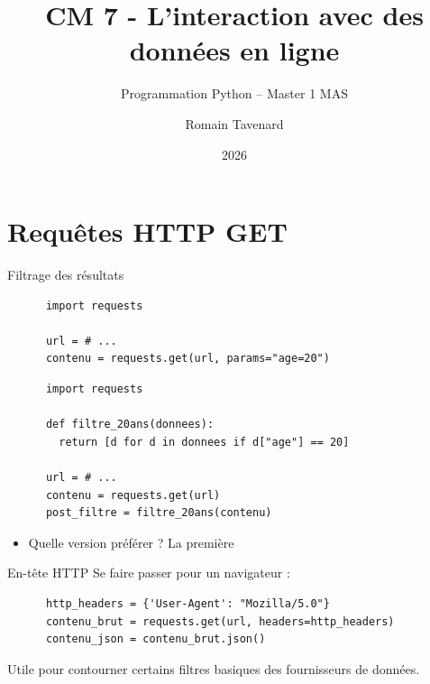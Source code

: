 \documentclass[10pt]{beamer}
\title[M1 MAS -- Python -- Fichiers]{CM 7 - L'interaction avec des données en ligne}
\subtitle{Programmation Python -- Master 1 MAS}
\author{Romain Tavenard}
\date{2026}
\institute{%
\hypersetup{urlcolor=.}
\makebox[2.2ex][c]{\faEnvelope}\enspace\href{mailto:romain.tavenard@univ-rennes2.fr}{\texttt{romain.tavenard@univ-rennes2.fr}}\\%
}
\begin{document}
\maketitle

\section{Requêtes HTTP GET}

\begin{frame}[fragile]{Filtrage des résultats}


  \begin{beamercodeblock}
    \begin{verbatim}
      import requests

      url = # ...
      contenu = requests.get(url, params="age=20")
    \end{verbatim}
  \end{beamercodeblock}

  \begin{beamercodeblock}
    \begin{verbatim}
      import requests

      def filtre_20ans(donnees):
        return [d for d in donnees if d["age"] == 20]

      url = # ...
      contenu = requests.get(url)
      post_filtre = filtre_20ans(contenu)
    \end{verbatim}
  \end{beamercodeblock} 

  \begin{itemize}
    \item Quelle version préférer ? \pause \alert{La première}
  \end{itemize}

\end{frame}

\begin{frame}[fragile]{En-tête HTTP}
  Se faire passer pour un navigateur :
  \begin{beamercodeblock}
    \begin{verbatim}
      http_headers = {'User-Agent': "Mozilla/5.0"}
      contenu_brut = requests.get(url, headers=http_headers)
      contenu_json = contenu_brut.json()
    \end{verbatim}
  \end{beamercodeblock}

  Utile pour contourner certains filtres basiques des fournisseurs de données.
\end{frame}
\end{document}
